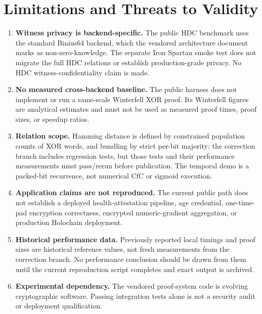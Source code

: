 \documentclass[11pt,twocolumn]{article}
\begin{document}
\section{Limitations and Threats to Validity}

\begin{enumerate}
    \item \textbf{Witness privacy is backend-specific.} The public HDC benchmark uses the standard Binius64 backend, which the vendored architecture document marks as non-zero-knowledge. The separate Iron Spartan smoke test does not migrate the full HDC relations or establish production-grade privacy. No HDC witness-confidentiality claim is made.

    \item \textbf{No measured cross-backend baseline.} The public harness does not implement or run a same-scale Winterfell XOR proof. Its Winterfell figures are analytical estimates and must not be used as measured proof times, proof sizes, or speedup ratios.

    \item \textbf{Relation scope.} Hamming distance is defined by constrained population counts of XOR words, and bundling by strict per-bit majority; the correction branch includes regression tests, but those tests and their performance measurements must pass/rerun before publication. The temporal demo is a packed-bit recurrence, not numerical CfC or sigmoid execution.

    \item \textbf{Application claims are not reproduced.} The current public path does not establish a deployed health-attestation pipeline, age credential, one-time-pad encryption correctness, encrypted numeric-gradient aggregation, or production Holochain deployment.

    \item \textbf{Historical performance data.} Previously reported local timings and proof sizes are historical reference values, not fresh measurements from the correction branch. No performance conclusion should be drawn from them until the current reproduction script completes and exact output is archived.

    \item \textbf{Experimental dependency.} The vendored proof-system code is evolving cryptographic software. Passing integration tests alone is not a security audit or deployment qualification.
\end{enumerate}
\end{document}
